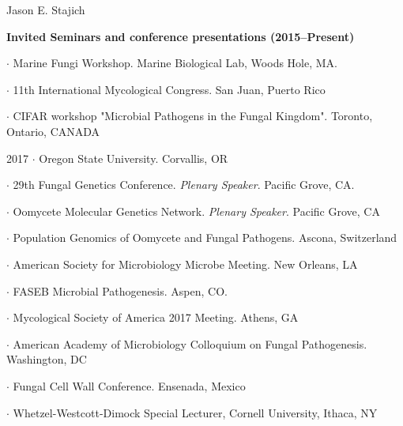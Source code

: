 \documentclass[10pt]{article}
\begin{document}
\begin{cv}{\centerline{Jason E. Stajich}}
\begin{cvlistcompact}{\bf Invited Seminars and conference presentations (2015--Present)}
\item $\cdot$ Marine Fungi Workshop. Marine Biological Lab, Woods Hole, MA.
\item $\cdot$ 11th International Mycological Congress. San Juan, Puerto Rico
\item $\cdot$ CIFAR workshop "Microbial Pathogens in the Fungal Kingdom". Toronto, Ontario, CANADA
\item [2017] $\cdot$ Oregon State University. Corvallis, OR
\item $\cdot$ 29th Fungal Genetics Conference. \textit{Plenary Speaker}. Pacific Grove, CA.
\item $\cdot$ Oomycete Molecular Genetics Network. \textit{Plenary Speaker}. Pacific Grove, CA
\item $\cdot$ Population Genomics of Oomycete and Fungal Pathogens. Ascona, Switzerland
\item $\cdot$ American Society for Microbiology Microbe Meeting. New Orleans, LA
\item $\cdot$ FASEB Microbial Pathogenesis. Aspen, CO.
\item $\cdot$ Mycological Society of America 2017 Meeting. Athens, GA
\item $\cdot$ American Academy of Microbiology Colloquium on Fungal
  Pathogenesis. Washington, DC
\item $\cdot$ Fungal Cell Wall Conference. Ensenada, Mexico
\item $\cdot$ Whetzel-Westcott-Dimock Special Lecturer, Cornell University, Ithaca, NY

\end{cvlistcompact}
\end{cv}
\end{document}
